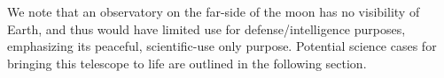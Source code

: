 We note that an observatory on the far-side of the moon has no visibility of Earth, and thus would have limited use for defense/intelligence purposes, emphasizing its peaceful, scientific-use only purpose. Potential science cases for bringing this telescope to life are outlined in the following section.
